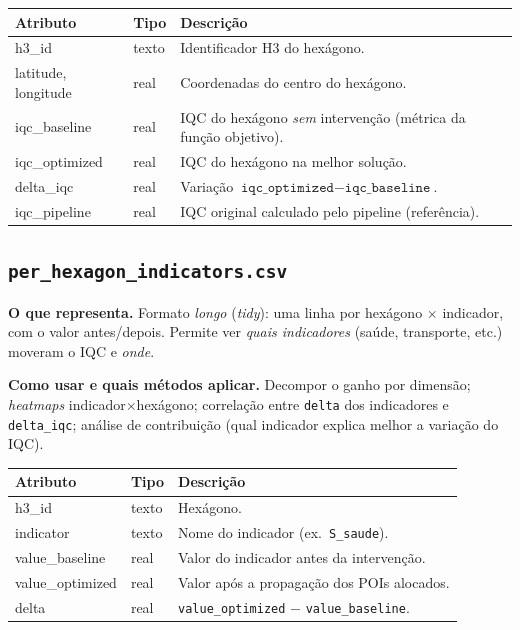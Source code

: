 \documentclass[11pt,a4paper]{article}
\begin{document}
\begin{center}\small
\begin{tabular}{@{}>{\ttfamily}l l p{8.0cm}@{}}
\toprule
\normalfont Atributo & \normalfont Tipo & \normalfont Descrição \\
\midrule
h3\_id        & texto & Identificador H3 do hexágono. \\
latitude, longitude & real & Coordenadas do centro do hexágono. \\
iqc\_baseline & real & IQC do hexágono \emph{sem} intervenção (métrica da função objetivo). \\
iqc\_optimized& real & IQC do hexágono na melhor solução. \\
delta\_iqc    & real & Variação $\texttt{iqc\_optimized}-\texttt{iqc\_baseline}$. \\
iqc\_pipeline & real & IQC original calculado pelo pipeline (referência). \\
\bottomrule
\end{tabular}
\end{center}

\subsection{\texttt{per\_hexagon\_indicators.csv}}

\textbf{O que representa.} Formato \emph{longo} (\emph{tidy}): uma linha por
hexágono $\times$ indicador, com o valor antes/depois. Permite ver \emph{quais
indicadores} (saúde, transporte, etc.) moveram o IQC e \emph{onde}.

\textbf{Como usar e quais métodos aplicar.} Decompor o ganho por dimensão;
\emph{heatmaps} indicador$\times$hexágono; correlação entre \texttt{delta} dos
indicadores e \texttt{delta\_iqc}; análise de contribuição (qual indicador explica
melhor a variação do IQC).

\begin{center}\small
\begin{tabular}{@{}>{\ttfamily}l l p{8.0cm}@{}}
\toprule
\normalfont Atributo & \normalfont Tipo & \normalfont Descrição \\
\midrule
h3\_id          & texto & Hexágono. \\
indicator       & texto & Nome do indicador (ex.\ \texttt{S\_saude}). \\
value\_baseline & real  & Valor do indicador antes da intervenção. \\
value\_optimized& real  & Valor após a propagação dos POIs alocados. \\
delta           & real  & \texttt{value\_optimized} $-$ \texttt{value\_baseline}. \\
\bottomrule
\end{tabular}
\end{center}
\end{document}
